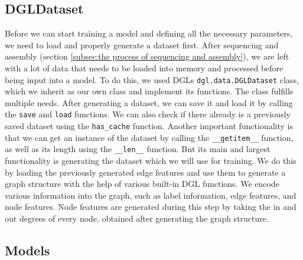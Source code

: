 \documentclass[times, utf8, diplomski, english]{fer_eng}
\begin{document}
\subsection{DGLDataset}

Before we can start training a model and defining all the necessary parameters, we need to load and properly generate a dataset first. After sequencing and assembly (section \ref{subsec:the process of sequencing and assembly}), we are left with a lot of data that needs to be loaded into memory and processed before being input into a model. To do this, we used DGLs \texttt{dgl.data.DGLDataset} class, which we inherit as our own class and implement its functions. The class fulfills multiple needs. After generating a dataset, we can save it and load it by calling the \texttt{save} and \texttt{load} functions. We can also check if there already is a previously saved dataset using the \texttt{has\_cache} function. Another important functionality is that we can get an instance of the dataset by calling the \texttt{\_\_getitem\_\_} function, as well as its length using the \texttt{\_\_len\_\_} function. But its main and largest functionality is generating the dataset which we will use for training. We do this by loading the previously generated edge features and use them to generate a graph structure with the help of various built-in DGL functions. We encode various information into the graph, such as label information, edge features, and node features. Node features are generated during this step by taking the in and out degrees of every node, obtained after generating the graph structure.

\subsection{Models}
\end{document}
